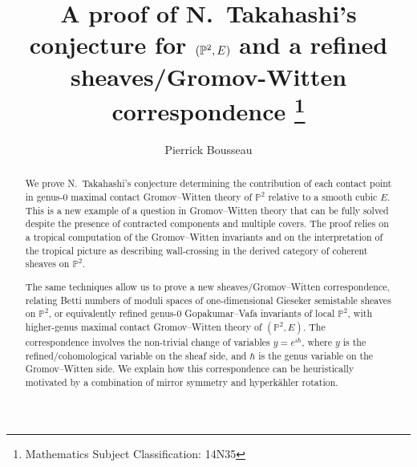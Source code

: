 \documentclass[11pt,letterpaper]{amsart}
\title[A proof of N.\ Takahashi's conjecture]{A proof of N.\ Takahashi's conjecture for 
$(\PP^2,E)$ and a refined sheaves/Gromov-Witten correspondence \footnote{Mathematics Subject Classification: 14N35}}
\author{Pierrick Bousseau}
\date{}
\newcommand\PP{\mathbb P}
\begin{document}
\begin{abstract}
We prove N.\ Takahashi's conjecture determining the contribution of each contact point in genus-$0$ maximal contact Gromov--Witten theory of $\PP^2$ relative to a smooth cubic $E$. 
This is a new example of a question in Gromov--Witten theory that can be fully solved despite the presence of
contracted components and multiple covers.
The proof relies on a tropical computation of the Gromov--Witten invariants and on the interpretation of the tropical picture as describing wall-crossing in the derived category of coherent sheaves on $\PP^2$.
 
The same techniques allow us to prove a new sheaves/Gromov--Witten correspondence, relating Betti numbers of moduli spaces of one-dimensional Gieseker semistable sheaves on $\PP^2$, or equivalently refined genus-$0$ Gopakumar--Vafa invariants of local $\PP^2$,
with higher-genus maximal contact Gromov--Witten theory of $(\PP^2,E)$. The correspondence involves the non-trivial change of variables $y=e^{i \hbar}$, where $y$ is the refined/cohomological variable on the sheaf side, and $\hbar$ is the genus variable on the Gromov--Witten side. We explain how this correspondence can be heuristically motivated by a combination of mirror symmetry and hyperkähler rotation.
\end{abstract}



\maketitle

\setcounter{tocdepth}{1}


\tableofcontents

\thispagestyle{empty}


\newpage
\end{document}

